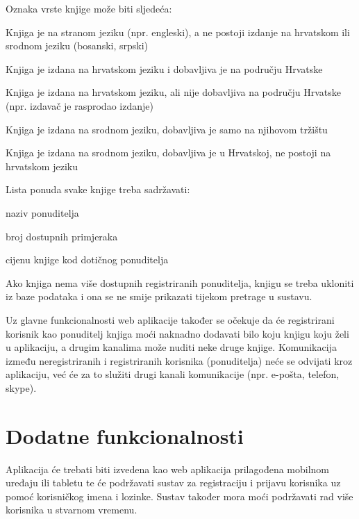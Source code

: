 	\pagebreak
		
	Oznaka vrste knjige može biti sljedeća:
	
	\begin{packed_item}
		\item Knjiga je na stranom jeziku (npr. engleski), a ne postoji izdanje na hrvatskom ili srodnom jeziku (bosanski, srpski)
		\item Knjiga je izdana na hrvatskom jeziku i dobavljiva je na području Hrvatske
		\item Knjiga je izdana na hrvatskom jeziku, ali nije dobavljiva na području Hrvatske (npr. izdavač je rasprodao izdanje)
		\item Knjiga je izdana na srodnom jeziku, dobavljiva je samo na njihovom tržištu
		\item Knjiga je izdana na srodnom jeziku, dobavljiva je u Hrvatskoj, ne postoji na hrvatskom jeziku
	\end{packed_item}
	
	Lista ponuda svake knjige treba sadržavati:
	
	\begin{packed_item}
		\item naziv ponuditelja
		\item broj dostupnih primjeraka
		\item cijenu knjige kod dotičnog ponuditelja
	\end{packed_item}
	
	Ako knjiga nema više dostupnih registriranih ponuditelja, knjigu se treba ukloniti iz baze podataka i ona se ne smije prikazati tijekom pretrage u sustavu.
	
	Uz glavne funkcionalnosti web aplikacije također se očekuje da će registrirani korisnik kao ponuditelj knjiga moći naknadno dodavati bilo koju knjigu koju želi u aplikaciju, a drugim kanalima može nuditi neke druge knjige. Komunikacija između neregistriranih i registriranih korisnika (ponuditelja) neće se odvijati kroz aplikaciju, već će za to služiti drugi kanali komunikacije (npr. e-pošta, telefon, skype).
	
	\section{Dodatne funkcionalnosti}
	
	Aplikacija će trebati biti izvedena kao web aplikacija prilagođena mobilnom uređaju ili tabletu te će podržavati sustav za registraciju i prijavu korisnika uz pomoć korisničkog imena i lozinke. Sustav također mora moći podržavati rad više korisnika u stvarnom vremenu.
				
